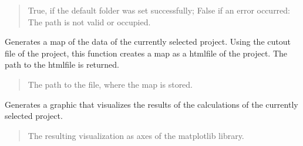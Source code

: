 \documentclass[letterpaper,10pt,english]{sphinxmanual}
\begin{document}
\begin{fulllineitems}
\begin{fulllineitems}
\begin{quote}
\begin{description}
\sphinxAtStartPar
True, if the default folder was set successfully; False if an error occurred: The path is not valid or occupied.

\sphinxAtStartPar
{}

\end{description}\end{quote}

\end{fulllineitems}


\begin{fulllineitems}
\label{\detokenize{apidoc/src.osm_configurator.control:src.osm_configurator.control.control_interface.IControl.generate_cut_out_map}}
\pysigstartsignatures
{}
\pysigstopsignatures
\sphinxAtStartPar
Generates a map of the data of the currently selected project.
Using the cut\sphinxhyphen{}out file of the project, this function creates a map as a html\sphinxhyphen{}file of the project. The path to the html\sphinxhyphen{}file is returned.
\begin{quote}\begin{description}
\sphinxAtStartPar
The path to the file, where the map is stored.

\sphinxAtStartPar
{}

\end{description}\end{quote}

\end{fulllineitems}


\begin{fulllineitems}
\label{\detokenize{apidoc/src.osm_configurator.control:src.osm_configurator.control.control_interface.IControl.get_calculation_visualization}}
\pysigstartsignatures
{}
\pysigstopsignatures
\sphinxAtStartPar
Generates a graphic that visualizes the results of the calculations of the currently selected project.
\begin{quote}\begin{description}
\sphinxAtStartPar
The resulting visualization as axes of the matplotlib library.


\end{description}
\end{quote}
\end{fulllineitems}
\end{fulllineitems}
\end{document}
